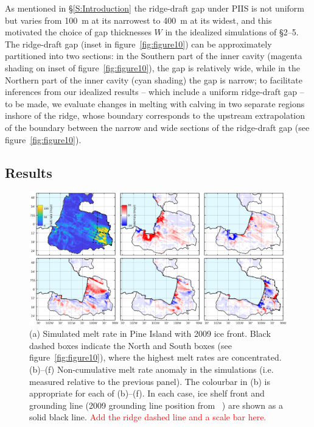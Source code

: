 \documentclass[draft]{agujournal2019}
\newcommand{\red}[1]{\textcolor{red}{#1}}
\begin{document}
As mentioned in \S\ref{S:Introduction} the ridge-draft gap under PIIS is not uniform but varies from 100~m at its narrowest to 400~m at its widest, and this motivated the choice of gap thicknesses $W$ in the idealized simulations of \S2--5. The ridge-draft gap (inset in figure~\ref{fig:figure10}) can be approximately partitioned into two sections: in the Southern part of the inner cavity (magenta shading on inset of figure~\ref{fig:figure10}), the gap is relatively wide, while in the Northern part of the inner cavity (cyan shading) the gap is narrow; to facilitate inferences from our idealized results -- which include a uniform ridge-draft gap -- to be made, we evaluate changes in melting with calving in two separate regions inshore of the ridge, whose boundary corresponds to the upstream extrapolation of the boundary between the narrow and wide sections of the ridge-draft gap (see figure~\ref{fig:figure10}). 

\subsection{Results}

\begin{figure}
    \centering
    \includegraphics[width = \textwidth]{../make_figures/plots/figure11.eps}
    \caption{(a) Simulated melt rate in Pine Island with 2009 ice front. Black dashed boxes indicate the North and South boxes (see figure~\ref{fig:figure10}), where the highest melt rates are concentrated. (b)--(f) Non-cumulative melt rate anomaly in the simulations (i.e. measured relative to the previous panel). The colourbar in (b) is appropriate for each of (b)--(f). In each case, ice shelf front and grounding line (2009 grounding line position from ~\cite{Joughin2010GRL}) are shown as a solid black line. \red{Add the ridge dashed line and a scale bar here.}} 
    \label{fig:figure11}
\end{figure}
\end{document}
